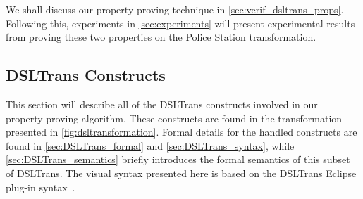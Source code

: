 We shall discuss our property proving technique in \cref{sec:verif_dsltrans_props}. Following this, experiments in \cref{sec:experiments} will present experimental results from proving these two properties on the Police Station transformation.





\subsection{DSLTrans Constructs}
\label{subsec:DSLTrans_constructs}
This section will describe all of the DSLTrans constructs involved in our
property-proving algorithm. These constructs are found in the transformation presented in \cref{fig:dsltransformation}. Formal details for the handled constructs are found in \cref{sec:DSLTrans_formal} and \cref{sec:DSLTrans_syntax}, while \cref{sec:DSLTrans_semantics} briefly introduces the formal semantics of this subset of DSLTrans. The visual syntax presented here is based on the DSLTrans Eclipse plug-in syntax~\cite{dsltrans_manual}.

